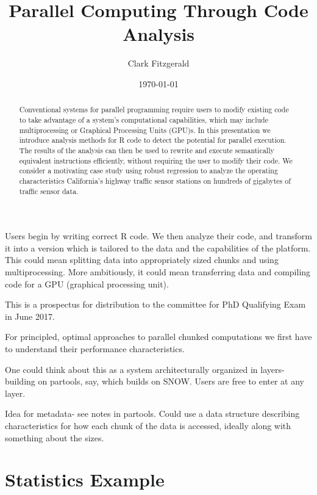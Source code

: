 \documentclass[12pt]{article}
\begin{document}
\title{Parallel Computing Through Code Analysis}
\date{\today}
\author{Clark Fitzgerald}
\maketitle

\begin{abstract}

    Conventional systems for parallel programming require users to modify
    existing code to take advantage of a system's computational
    capabilities, which may include multiprocessing or Graphical Processing
    Units (GPU)s. In this presentation we introduce analysis methods for R
    code to detect the potential for parallel execution. The results of the
    analysis can then be used to rewrite and execute semantically
    equivalent instructions efficiently, without requiring the user to
    modify their code. We consider a motivating case study using robust
    regression to analyze the operating characteristics California's
    highway traffic sensor stations on hundreds of gigabytes of traffic
    sensor data.

\end{abstract}

Users begin by writing correct R code.  We then analyze their code, and
transform it into a version which is tailored to the data and the
capabilities of the platform. This could mean splitting data into
appropriately sized chunks and using multiprocessing. More ambitiously,
it could mean transferring data and compiling code for a GPU (graphical
processing unit).


This is a prospectus for distribution to the committee for PhD
Qualifying Exam in June 2017.

For principled, optimal approaches to parallel chunked computations we
first have to understand their performance characteristics.

One could think about this as a system architecturally organized in layers- building on
partools, say, which builds on SNOW. Users are free to enter at any layer.

Idea for metadata- see notes in partools. Could use a data structure
describing characteristics for how each chunk of the data is accessed,
ideally along with something about the sizes.

\section{Statistics Example}
\end{document}
